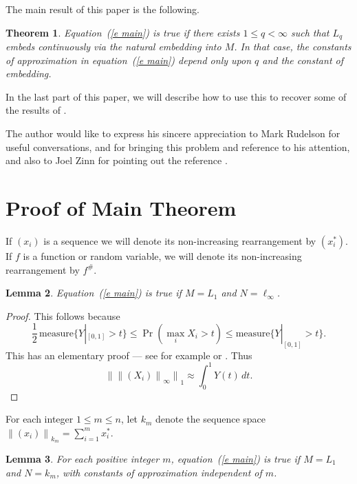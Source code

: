 \documentclass[12pt]{amsart}
\newtheorem{thm}{Theorem}
\newtheorem{lemma}[thm]{Lemma}
\newcommand{\snormo}[1]{{\mathopen\|#1\mathclose\|}}
\newcommand{\measure}{\text{measure}}
\begin{document}
The main result of this paper is the following.

\begin{thm}
\label{t main}
Equation~(\ref{e main}) is true if there exists $1\le q < \infty$ such that 
$L_q$ embeds continuously via
the natural embedding into $M$.  In that case, the constants of approximation
in equation~(\ref{e main})
depend only upon $q$ and the constant of embedding.
\end{thm}

In the last part of this paper,
we will describe how to use this to recover some of the results of 
\cite{gordon et al}.

The author would like to express his sincere appreciation to Mark Rudelson
for useful conversations, and 
for bringing this problem and reference \cite{gordon et al} to his attention,
and also to Joel Zinn for pointing out the reference \cite{marcus-zinn}.

\section{Proof of Main Theorem}

If $(x_i)$ is a sequence we will denote its non-increasing rearrangement
by $(x^*_i)$.  If $f$ is a function or random variable, we will denote
its non-increasing rearrangement by $f^\#$.

\begin{lemma}
\label{l L_1 l_infty}
Equation~(\ref{e main}) is true if $M = L_1$ and $N = \ell_\infty$.
\end{lemma}

\begin{proof}
This follows because 
\begin{equation}
\label{e max in Pr}
    {\textstyle\frac12}\,\measure\{ Y|_{[0,1]} > t\}
    \le
    \Pr(\max_i X_i > t)
    \le
    \measure\{ Y|_{[0,1]} > t\} .
\end{equation}
This has an elementary proof --- 
see for example \cite[Proposition 2.1]{hitczenko-montgomery-smith} or
\cite{gine-zinn}.  Thus
\begin{equation}
\label{e L_1 l_infty}
   \snormo{\snormo{(X_i)}_\infty}_1 \approx \int_0^1 Y(t) \, dt .
\end{equation}
\end{proof}

For each integer $1\le m\le n$, let $k_m$ denote the sequence space
$\snormo{(x_i)}_{k_m} = \sum_{i=1}^m x^*_i$.

\begin{lemma}
\label{l L_1 k_m}
For each positive integer $m$, 
equation~(\ref{e main}) is true if $M = L_1$ and $N = k_m$, with
constants of approximation independent of $m$.
\end{lemma}
\end{document}
